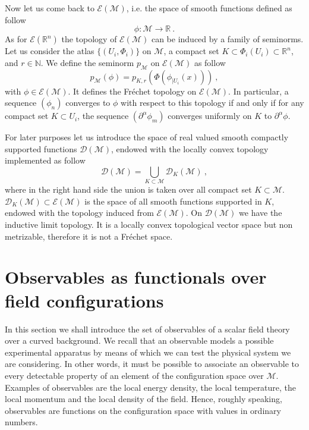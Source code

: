 \documentclass[11pt]{book}
\newcommand{\Dcal}{\mathcal{D}}
\newcommand{\Ecal}{\mathcal{E}}
\newcommand{\Mcal}{\mathcal{M}}
\newcommand{\Nbb}{\mathbb{N}}
\newcommand{\Rbb}{\mathbb{R}}
\theoremstyle{break}
\begin{document}
Now let us come back to $\Ecal(\Mcal)$, i.e. the space of smooth functions defined as follow
%
\begin{equation*}
\phi : \Mcal \to \Rbb \ . 
\end{equation*}
%
As for $\Ecal(\Rbb^n)$ the topology of $\Ecal(\Mcal)$ can be induced by a family of seminorms. Let us consider the atlas $\{(U_i,\Phi_i)\}$ on $\Mcal$, a compact set $K \subset \Phi_i(U_i) \subset \Rbb^n$, and $r \in \Nbb$. We define the seminorm $p_\Mcal$ on $\Ecal(\Mcal)$ as follow
%
\begin{equation*}
p_\Mcal(\phi) = p_{K,r}\left( \Phi\left( \phi_{|U_i}(x) \right) \right) \ ,
\end{equation*}
%
with $\phi \in \Ecal\left(\Mcal \right)$. It defines the Fréchet topology on $\Ecal\left(\Mcal \right)$. In particular, a sequence $(\phi_n)$ converges to $\phi$ with respect to this topology if and only if for any compact set $K \subset U_i$, the sequence $\left(\partial^\alpha\phi_m\right)$ converges uniformly on $K$ to $\partial^\alpha\phi$.


For later purposes let us introduce the space of real valued smooth compactly supported functions $\Dcal(\Mcal)$, endowed with the locally convex topology implemented as follow
%
\begin{equation*}
\Dcal(\Mcal) = \bigcup_{K\subset\Mcal} \Dcal_K(\Mcal) \ ,
\end{equation*}
%
where in the right hand side the union is taken over all compact set $K \subset \Mcal$. $\Dcal_K(\Mcal) \subset \Ecal(\Mcal)$ is the space of all smooth functions supported in $K$, endowed with the topology induced from $\Ecal(\Mcal)$. On $\Dcal(\Mcal)$ we have the inductive limit topology. It is a locally convex topological vector space but non metrizable, therefore it is not a Fréchet space. 




\section{Observables as functionals over field configurations}\label{p:OBS}


In this section we shall introduce the set of observables of a scalar field theory over a curved background. We recall that an observable models a possible experimental apparatus by means of which we can test the physical system we are considering. In other words, it must be possible to associate an observable to every detectable property of an element of the configuration space over $\Mcal$. Examples of observables are the local energy density, the local temperature, the local momentum and the local density of the field.  Hence, roughly speaking, observables are functions on the configuration space with values in ordinary numbers.
\end{document}
